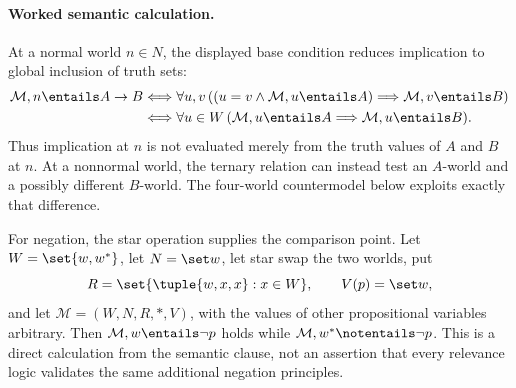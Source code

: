 \paragraph{Worked semantic calculation.}
At a normal world \(n\in N\), the displayed base condition reduces implication
to global inclusion of truth sets:
\[
\begin{aligned}
  \mathcal M,n\entails A\to B
  &\Longleftrightarrow
    \forall u,v\,
      ((u=v\land\mathcal M,u\entails A)
        \Longrightarrow\mathcal M,v\entails B)\\
  &\Longleftrightarrow
    \forall u\in W\,
      (\mathcal M,u\entails A
       \Longrightarrow\mathcal M,u\entails B).
\end{aligned}
\]
Thus implication at \(n\) is not evaluated merely from the truth values of
\(A\) and \(B\) at \(n\).  At a nonnormal world, the ternary relation can
instead test an \(A\)-world and a possibly different \(B\)-world.  The
four-world countermodel below exploits exactly that difference.

For negation, the star operation supplies the comparison point.  Let
\(W=\set{w,w^*}\), let \(N=\set w\), let star swap the two worlds, put
\[
  R=\set{\tuple{w,x,x}:x\in W},
  \qquad
  V(p)=\set w,
\]
and let \(\mathcal M=(W,N,R,{*},V)\), with the values of other
propositional variables arbitrary.
Then \(\mathcal M,w\entails\neg p\) holds while
\(\mathcal M,w^*\notentails\neg p\).  This is a direct calculation from the
semantic clause, not an assertion that every relevance logic validates the
same additional negation principles.

